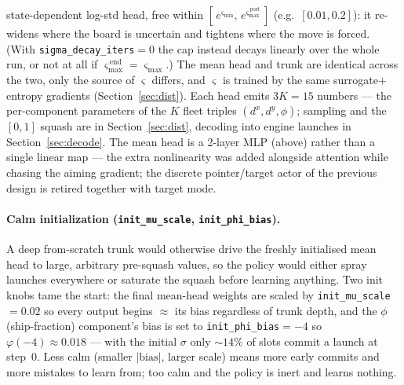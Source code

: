 \documentclass[11pt]{article}
\begin{document}
state-dependent log-std head, free within $[\,e^{\varsigma_{\min}},\,e^{\varsigma_{\max}^{\,\mathrm{post}}}\,]$
(e.g.\ $[0.01,0.2]$): it re-widens where the board is uncertain and tightens where the move is forced.
(With \texttt{sigma\_decay\_iters}$=0$ the cap instead decays linearly over the whole run, or not at all
if $\varsigma_{\max}^{\,\mathrm{end}}{=}\varsigma_{\max}$.) The mean head and trunk are identical
across the two, only the source of $\varsigma$ differs, and $\varsigma$ is trained by the same
surrogate$+$entropy gradients (Section~\ref{sec:dist}). Each head emits $3K=15$ numbers --- the
per-component parameters of the $K$ fleet triples $(d^x,d^y,\phi)$; sampling and the $[0,1]$ squash
are in Section~\ref{sec:dist}, decoding into engine launches in Section~\ref{sec:decode}. The mean
head is a 2-layer MLP (above) rather than a single linear map --- the extra nonlinearity was added
alongside attention while chasing the aiming gradient; the discrete pointer/target actor of the
previous design is retired together with target mode.

\paragraph{Calm initialization (\texttt{init\_mu\_scale}, \texttt{init\_phi\_bias}).} A deep
from-scratch trunk would otherwise drive the freshly initialised mean head to large, arbitrary
pre-squash values, so the policy would either spray launches everywhere or saturate the squash before
learning anything. Two init knobs tame the start: the final mean-head weights are scaled by
\texttt{init\_mu\_scale}$=0.02$ so every output begins $\approx$ its bias regardless of trunk depth,
and the $\phi$ (ship-fraction) component's bias is set to \texttt{init\_phi\_bias}$=-4$ so
$\varphi(-4)\approx0.018$ --- with the initial $\sigma$ only $\sim$$14\%$ of slots commit a launch at
step~$0$. Less calm (smaller $|\text{bias}|$, larger scale) means more early commits and more mistakes
to learn from; too calm and the policy is inert and learns nothing.
\end{document}
